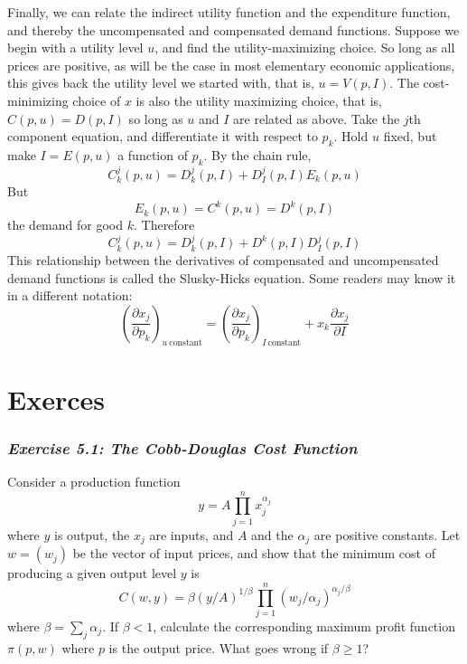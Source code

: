 Finally, we can relate the indirect utility function and the expenditure function, and thereby the uncompensated and compensated demand functions. Suppose we begin with a utility level $u$, and find the utility-maximizing choice. So long as all prices are positive, as will be the case in most elementary economic applications, this gives back the utility level we started with, that is, $u=V(p,I)$. The cost-minimizing choice of $x$ is also the utility maximizing choice, that is, $C(p,u) = D(p,I)$ so long as $u$ and $I$ are related as above. Take the $j$th component equation, and differentiate it with respect to $p_k$. Hold $u$ fixed, but make $I=E(p,u)$ a function of $p_k$. By the chain rule,
\begin{equation*}
   C_k^j(p,u) = D_k^j(p,I) + D_I^j(p,I) E_k(p,u)
\end{equation*}
But
\begin{equation*}
   E_k(p,u) = C^k(p,u) = D^k(p,I)
\end{equation*}
the demand for good $k$. Therefore
\begin{equation} \label{equa5.21}
   C_k^j(p,u) = D_k^j(p, I) + D^k(p,I) D_I^j(p,I)
\end{equation}
This relationship between the derivatives of compensated and uncompensated demand functions is called the Slusky-Hicks equation. Some readers may know it in a different notation:
\begin{equation*}
   \left( \dfrac{\partial x_j}{\partial p_k} \right)_{u \ \mbox{constant}} = \left( \dfrac{\partial x_j}{\partial p_k} \right)_{I \ \mbox{constant}} + x_k \dfrac{\partial x_j}{\partial I}
\end{equation*}

\section*{Exerces}

\subsubsection*{\textit{Exercise 5.1: The Cobb-Douglas Cost Function}}

Consider a production function
\begin{equation} \label{equa5.22}
y = A \prod\limits_{j=1}^n  x_j^{\alpha_j}
\end{equation}
where $y$ is output, the $x_j$ are inputs, and $A$ and the $\alpha_j$ are positive constants. Let $w=(w_j)$ be the vector of input prices, and show that the minimum cost of producing a given output level $y$ is
\begin{equation} \label{equa5.23}
  C(w,y) = \beta (y/A)^{1/\beta}  \prod\limits_{j=1}^n  (w_j / \alpha_j)^{\alpha_j / \beta}
\end{equation}
where $\beta = \sum_j \alpha_j$. If $\beta <1$, calculate the corresponding maximum profit function $\pi(p,w)$ where $p$ is the output price. What goes wrong if $\beta \geq 1$?

